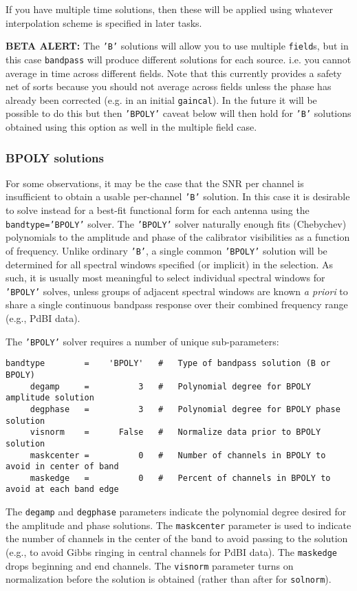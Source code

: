If you have multiple time solutions, then these will be applied using
whatever interpolation scheme is specified in later tasks. 

{\bf BETA ALERT:} The {\tt 'B'} solutions will allow you to use multiple 
{\tt field}s, but in this case {\tt bandpass} will produce different
solutions for each source. i.e. you cannot average in time across
different fields.  Note that this currently provides a safety net of
sorts because you should not average across fields unless the phase has already
been corrected (e.g. in an initial {\tt gaincal}). In the future it
will be possible to do this but then {\tt 'BPOLY'} caveat below will
then hold for {\tt 'B'} solutions obtained using this option as well
in the multiple field case.  

\subsubsection{BPOLY solutions}
\label{section:cal.solve.band.bpoly}

For some observations, it may be the case that the SNR per channel is
insufficient to obtain a usable per-channel {\tt 'B'} solution.  In this
case it is desirable to solve instead for a best-fit functional form
for each antenna using the {\tt bandtype='BPOLY'} solver. 
The {\tt 'BPOLY'} solver naturally enough fits (Chebychev) polynomials to the
amplitude and phase of the calibrator 
visibilities as a function of frequency.  Unlike ordinary {\tt 'B'}, a
single common {\tt 'BPOLY'} solution will be determined for all spectral
windows specified (or implicit) in the selection.  As
such, it is usually most meaningful to select individual spectral
windows for {\tt 'BPOLY'} solves, unless groups of adjacent spectral windows
are known {\it a priori} to share a single continuous bandpass
response over their combined frequency range (e.g., PdBI data).

The {\tt 'BPOLY'} solver requires a number of unique sub-parameters:
\small
\begin{verbatim}
bandtype        =    'BPOLY'   #   Type of bandpass solution (B or BPOLY)
     degamp     =          3   #   Polynomial degree for BPOLY amplitude solution
     degphase   =          3   #   Polynomial degree for BPOLY phase solution
     visnorm    =      False   #   Normalize data prior to BPOLY solution
     maskcenter =          0   #   Number of channels in BPOLY to avoid in center of band
     maskedge   =          0   #   Percent of channels in BPOLY to avoid at each band edge
\end{verbatim}
\normalsize
The {\tt degamp} and {\tt degphase} parameters indicate the polynomial degree
desired for the amplitude and phase solutions.  The {\tt maskcenter}
parameter is used to indicate the number of channels in the center
of the band to avoid passing to the solution (e.g., to avoid Gibbs
ringing in central channels for PdBI data).  The {\tt maskedge} drops
beginning and end channels.  The {\tt visnorm} parameter turns on
normalization before the solution is obtained (rather than after for
{\tt solnorm}).

